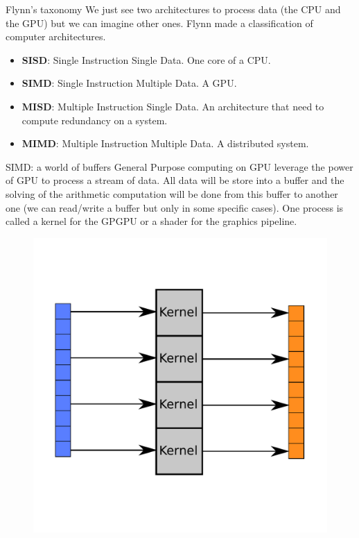 \documentclass{beamer}
\begin{document}
\begin{frame}{Flynn's taxonomy}
	We just see two architectures to process data (the CPU and the GPU) but we can imagine other ones. Flynn made a classification of computer architectures.
	\begin{itemize}
		\item \textbf{SISD}: Single Instruction Single Data. One core of a CPU.
		\item \textbf{SIMD}: Single Instruction Multiple Data. A GPU.
		\item \textbf{MISD}: Multiple Instruction Single Data. An architecture that need to compute redundancy on a system.
		\item \textbf{MIMD}: Multiple Instruction Multiple Data. A distributed system.
	\end{itemize}
\end{frame}

\begin{frame}{SIMD: a world of buffers}
	General Purpose computing on GPU leverage the power of GPU to process a stream of data. All data will be store into a buffer and the solving of the arithmetic computation will be done from this buffer to another one (we can read/write a buffer but only in some specific cases). One process is called a kernel for the GPGPU or a shader for the graphics pipeline.
	\begin{figure}
		\includegraphics[scale=0.3]{figures/buffer.pdf}
	\end{figure}
\end{frame}
\end{document}
